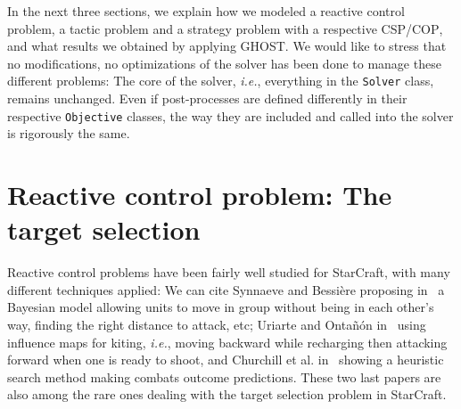 \documentclass{article}
\newcommand{\csp}{\textsc{CSP}\xspace}
\newcommand{\cop}{\textsc{COP}\xspace}
\newcommand{\ghost}{\textsc{GHOST}\xspace}
\newcommand{\ie}{\textit{i.e.}}
\begin{document}
In  the next  three sections,  we explain  how we  modeled a  reactive
control  problem, a  tactic  problem  and a  strategy  problem with  a
respective \csp/\cop, and what results we obtained by applying \ghost.
We would like to stress that no modifications, no optimizations of the
solver has been  done to manage these different problems:  The core of
the  solver, \ie,  everything  in the  \texttt{Solver} class,  remains
unchanged.  Even  if post-processes  are defined differently  in their
respective \texttt{Objective}  classes, the way they  are included and
called into the solver is rigorously the same.


\section{Reactive control problem: The target selection}\label{sec:target}

Reactive control problems have been fairly well studied for StarCraft,
with  many different  techniques  applied: We  can  cite Synnaeve  and
Bessi{\`e}re  proposing   in~\cite{SynnaeveB11-b}  a   Bayesian  model
allowing units  to move in  group without  being in each  other's way,
finding the right distance to attack, etc; Uriarte and Onta{\~n}{\'o}n
in~\cite{UriarteO12}  using influence  maps  for  kiting, \ie,  moving
backward while recharging then attacking  forward when one is ready to
shoot,  and Churchill  et  al.  in~\cite{ChurchillSB12,  ChurchillB12}
showing a heuristic search  method making combats outcome predictions.
These two  last papers are also  among the rare ones  dealing with the
target selection problem in StarCraft.
\end{document}
